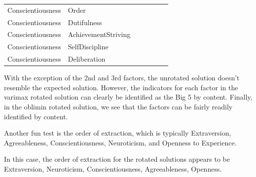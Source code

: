 \documentclass{article}\usepackage[]{graphicx}\usepackage[]{color}
\begin{document}
\begin{table}
\begin{tabular}[t]{lllllll}
Conscientiousness & Order & \cellcolor{white}{0.11} & \cellcolor{white}{0.11} & \cellcolor{yellow}{0.69} & \cellcolor{white}{0.08} & \cellcolor{white}{-0.06}\\
Conscientiousness & Dutifulness & \cellcolor{white}{0.32} & \cellcolor{white}{0.11} & \cellcolor{yellow}{0.8} & \cellcolor{white}{0.11} & \cellcolor{white}{0.09}\\
Conscientiousness & AchievementStriving & \cellcolor{white}{0.31} & \cellcolor{white}{0.1} & \cellcolor{yellow}{0.83} & \cellcolor{white}{-0.1} & \cellcolor{white}{0.12}\\
Conscientiousness & SelfDiscipline & \cellcolor{white}{0.25} & \cellcolor{white}{-0.06} & \cellcolor{yellow}{0.86} & \cellcolor{white}{0.12} & \cellcolor{white}{0.08}\\
Conscientiousness & Deliberation & \cellcolor{white}{0.09} & \cellcolor{white}{0.09} & \cellcolor{yellow}{0.69} & \cellcolor{white}{0.29} & \cellcolor{white}{0.1}\\
\bottomrule
\end{tabular}
\end{table}



With the exception of the 2nd and 3rd factors, the unrotated solution doesn't resemble the expected solution. However, the indicators for each factor in the varimax rotated solution can clearly be identified as the Big 5 by content. Finally, in the oblimin rotated solution, we see that the factors can be fairly readily identified by content.  

Another fun test is the order of extraction, which is typically Extraversion, Agreeableness, Conscientiousness, Neuroticism, and Openness to Experience.  

In this case, the order of extraction for the rotated solutions appears to be Extraversion, Neuroticism, Conscientiousness, Agreeableness, Openness. 
\end{document}
